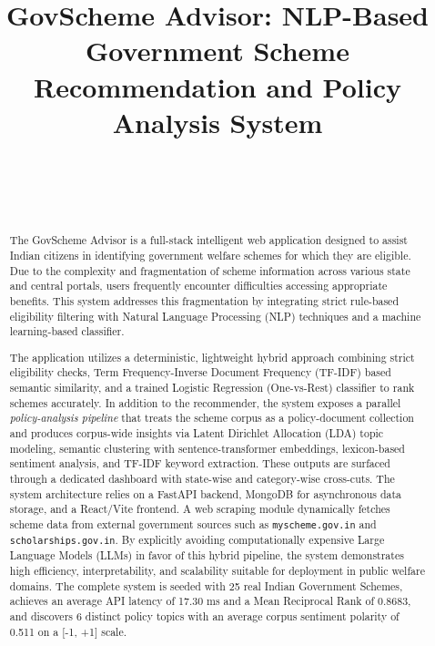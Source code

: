 \documentclass[10pt, journal, twocolumn]{IEEEtran}
\begin{document}
\title{GovScheme Advisor: NLP-Based Government Scheme Recommendation and Policy Analysis System}

\author{
     \\
    \vspace{0.2cm}
     \\
     \\
}

\maketitle

\begin{abstract}
The GovScheme Advisor is a full-stack intelligent web application designed to assist Indian citizens in identifying government welfare schemes for which they are eligible. Due to the complexity and fragmentation of scheme information across various state and central portals, users frequently encounter difficulties accessing appropriate benefits. This system addresses this fragmentation by integrating strict rule-based eligibility filtering with Natural Language Processing (NLP) techniques and a machine learning-based classifier.

The application utilizes a deterministic, lightweight hybrid approach combining strict eligibility checks, Term Frequency-Inverse Document Frequency (TF-IDF) based semantic similarity, and a trained Logistic Regression (One-vs-Rest) classifier to rank schemes accurately. In addition to the recommender, the system exposes a parallel \emph{policy-analysis pipeline} that treats the scheme corpus as a policy-document collection and produces corpus-wide insights via Latent Dirichlet Allocation (LDA) topic modeling, semantic clustering with sentence-transformer embeddings, lexicon-based sentiment analysis, and TF-IDF keyword extraction. These outputs are surfaced through a dedicated dashboard with state-wise and category-wise cross-cuts. The system architecture relies on a FastAPI backend, MongoDB for asynchronous data storage, and a React/Vite frontend. A web scraping module dynamically fetches scheme data from external government sources such as \texttt{myscheme.gov.in} and \texttt{scholarships.gov.in}. By explicitly avoiding computationally expensive Large Language Models (LLMs) in favor of this hybrid pipeline, the system demonstrates high efficiency, interpretability, and scalability suitable for deployment in public welfare domains. The complete system is seeded with 25 real Indian Government Schemes, achieves an average API latency of 17.30 ms and a Mean Reciprocal Rank of 0.8683, and discovers 6 distinct policy topics with an average corpus sentiment polarity of 0.511 on a [-1, +1] scale.
\end{abstract}
\end{document}
